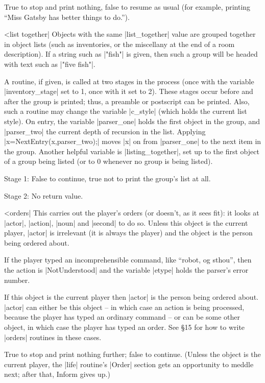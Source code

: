 {{{\rr True to stop and print nothing, false to resume as usual (for example,
printing ``Miss Gatsby has better things to do.'').

^^|list together|
\fo
Objects with the same |list_together| value are grouped together in
object lists (such as inventories, or the miscellany at the end of a
room description).  If a string such as |"fish"| is given, then such
a group will be headed with text such as |"five fish"|.

\noindent A routine, if given, is called at two stages in the process
(once with the variable |inventory_stage| set to 1, once with it set to 2).
These stages occur before and after the group is printed; thus, a
preamble or postscript can be printed.  Also, such a routine may
change the variable |c_style| (which holds the current list style).
On entry, the variable |parser_one| holds the first object in the
group, and |parser_two| the current depth of recursion in the list.
Applying |x=NextEntry(x,parser_two);| moves |x| on from |parser_one|
to the next item in the group.  Another helpful variable is
|listing_together|, set up to the first object of a group being listed
(or to 0 whenever no group is being listed).

\rr Stage 1: False to continue, true not to print the group's list
at all.

\rr Stage 2: No return value.

^^|orders|
\fato  This carries out the player's
orders (or doesn't, as it sees fit): it looks at |actor|, |action|,
|noun| and |second| to do so.  Unless this object is the current
player, |actor| is irrelevant (it is always the player) and the
object is the person being ordered about.

\noindent If the player typed an incomprehensible command, like
``robot, og sthou'', then the action is |NotUnderstood| and the
variable |etype| holds the parser's error number.

\noindent If this object is the current player then |actor| is
the person being ordered about.  |actor| can either be this
object -- in which case an action is being processed, because
the player has typed an ordinary command -- or can be some other
object, in which case the player has typed an order.  See
\S 15 for how to write |orders| routines in these cases.

\rr True to stop and print nothing further; false to continue.
(Unless the object is the current player, the |life| routine's
|Order| section gets an opportunity to meddle next; after that,
Inform gives up.)

}}}

